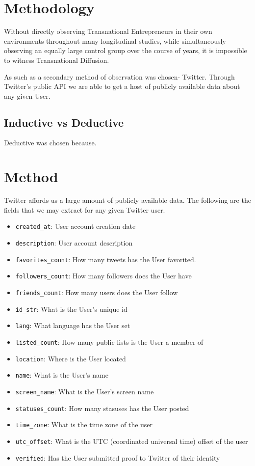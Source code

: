 \section{Methodology}
Without directly observing Transnational Entrepreneurs in their own environments throughout many longitudinal studies, while simultaneously observing an equally large control group over the course of years, it is impossible to witness Transnational Diffusion.
\par
As such as a secondary method of observation was chosen- Twitter. Through Twitter's public API we are able to get a host of publicly available data about any given User.

\subsection{Inductive vs Deductive}
Deductive was chosen because.

\section{Method}
Twitter affords us a large amount of publicly available data. The following are the fields that we may extract for any given Twitter user.

\begin{itemize}
\item \verb|created_at|: User account creation date
\item \verb|description|: User account description
\item \verb|favorites_count|: How many tweets has the User favorited.
\item \verb|followers_count|: How many followers does the User have
\item \verb|friends_count|: How many users does the User follow
\item \verb|id_str|: What is the User's unique id
\item \verb|lang|: What language has the User set
\item \verb|listed_count|: How many public lists is the User a member of
\item \verb|location|: Where is the User located
\item \verb|name|: What is the User's name
\item \verb|screen_name|: What is the User's screen name
\item \verb|statuses_count|: How many stasuses has the User posted
\item \verb|time_zone|: What is the time zone of the user
\item \verb|utc_offset|: What is the UTC (coordinated universal time) offset of the user
\item \verb|verified|: Has the User submitted proof to Twitter of their identity
\end{itemize}

